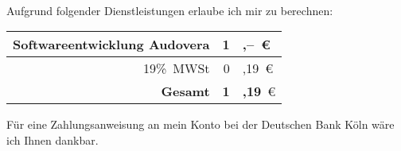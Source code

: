 \documentclass[fontsize=12pt,fromalign=right,fromrule=aftername,
  parskip,fromphone=true]{scrlttr2}
\begin{document}
\begin{letter}{\ }%


\opening{}

Aufgrund folgender Dienstleistungen  erlaube ich
mir zu berechnen:

\bigskip
\begin{tabular}{rr@{}l}
  Softwareentwicklung \textsf{Audovera} & 1&,--~\euro{}\\
  \hline
  19\%~MWSt & 0&,19~\euro{}\\
 \hline\hline
 \textbf{Gesamt} & \textbf{1}&\textbf{,19}~\euro{}\\
 \hline\hline
\end{tabular}
\bigskip

F\"ur eine Zahlungsanweisung an mein Konto  bei
der Deutschen Bank K\"oln w\"are ich Ihnen dankbar.

\closing{\ }

\end{letter}
\end{document}

